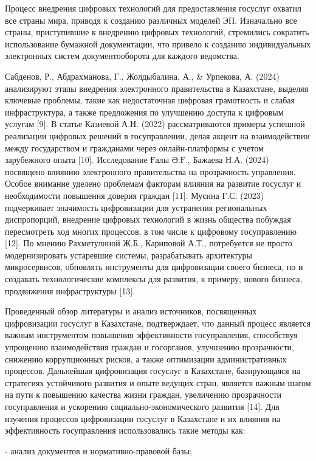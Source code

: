 {Процесс внедрения цифровых технологий для предоставления госуслуг
охватил все страны мира, приводя к созданию различных моделей ЭП.
Изначально все страны, приступившие к внедрению цифровых технологий,
стремились сократить использование бумажной документации, что привело к
созданию индивидуальных электронных систем документооборота для каждого
ведомства.

Сабденов, Р., Абдрахманова, Г., Жолдыбалина, А., \& Урпекова, А. (2024)
анализируют этапы внедрения электронного правительства в Казахстане,
выделяя ключевые проблемы, такие как недостаточная цифровая грамотность
и слабая инфраструктура, а также предложения по улучшению доступа к
цифровым услугам {[}9{]}. В статье Казиевой А.Н. (2022) рассматриваются
примеры успешной реализации цифровых решений в госуправлении, делая
акцент на взаимодействии между государством и гражданами через
онлайн-платформы с учетом зарубежного опыта {[}10{]}. Исследование Ғалы
Ә.Ғ., Бажаева Н.А. (2024) посвящено влиянию электронного правительства
на прозрачность управления. Особое внимание уделено проблемам факторам
влияния на развитие госуслуг и необходимости повышения доверия граждан
{[}11{]}. Мусина Г.С. (2023) подчеркивает значимость цифровизации для
устранения региональных диспропорций, внедрение цифровых технологий в
жизнь общества побуждая пересмотреть ход многих процессов, в том числе к
цифровому госуправлению {[}12{]}. По мнению Рахметулиной Ж.Б., Кариповой
А.Т., потребуется не просто модернизировать устаревшие системы,
разрабатывать архитектуры микросервисов, обновлять инструменты для
цифровизации своего бизнеса, но и создавать технологические комплексы
для развития, к примеру, нового бизнеса, продвижения инфраструктуры
{[}13{]}.

Проведенный обзор литературы и анализ источников, посвященных
цифровизации госуслуг в Казахстане, подтверждает, что данный процесс
является важным инструментом повышения эффективности госуправления,
способствуя упрощению взаимодействия граждан и госорганов, улучшению
прозрачности, снижению коррупционных рисков, а также оптимизации
административных процессов. Дальнейшая цифровизация госуслуг в
Казахстане, базирующаяся на стратегиях устойчивого развития и опыте
ведущих стран, является важным шагом на пути к повышению качества жизни
граждан, увеличению прозрачности госуправления и ускорению
социально-экономического развития {[}14{]}. Для изучения процессов
цифровизации госуслуг в Казахстане и их влияния на эффективность
госуправления использовались такие методы как:

- анализ документов и нормативно-правовой базы;

}
